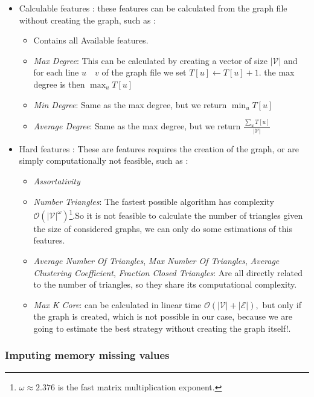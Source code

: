 \begin{itemize}
\begin{itemize}
    \end{itemize}
    \item Calculable features : these features can be calculated from the graph file without creating the graph, such as : 
        \begin{itemize}
            \item Contains all Available features.
            \item \textit{Max Degree}: This can be calculated by creating a vector of size $\lvert\mathcal{V}\vert$ and for each line $u \quad v$ of the graph file we set $T[u]\leftarrow T[u]+1.$ the max degree is then $\max_{u} T[u]$
            \item \textit{Min Degree}: Same as the max degree, but we return $\min_{u} T[u]$
            \item \textit{Average Degree}: Same as the max degree, but we return $\frac{\sum_u T[u]}{\lvert\mathcal{V}\rvert}$
    \end{itemize}
    \item Hard features : These are features requires the creation of the graph, or are simply computationally not feasible, such as :
    \begin{itemize}
        \item \textit{Assortativity}
        \item \textit{Number Triangles}: The fastest possible algorithm\cite{8} has complexity $\mathcal{O}(\lvert \mathcal{V}\rvert ^\omega)$\footnote{$\omega\approx 2.376$ is the fast matrix multiplication exponent.}.So it is not feasible to calculate the number of triangles given the size of considered graphs, we can only do some estimations of this features.
        \item \textit{Average Number Of Triangles}, \textit{Max Number Of Triangles}, \textit{Average Clustering Coefficient}, \textit{Fraction Closed Triangles}: Are all directly related to the number of triangles, so they share its computational complexity.
        \item \textit{Max K Core}: can be calculated in linear time $\mathcal{O}(\lvert\mathcal{V}\rvert+\lvert\mathcal{E}\rvert),$ but only if the graph is created, which is not possible in our case, because we are going to estimate the best strategy without creating the graph itself!. 
    
    \end{itemize}
\end{itemize}

\subsubsection{Imputing memory missing values}

